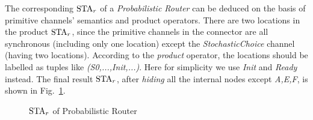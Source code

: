 \begin{example}
The corresponding $\mbox{STA}_r$ of a \emph{Probabilistic Router} can be deduced on the basis of primitive channels' semantics and product operators.
There are two locations in the product $\mbox{STA}_r$, since the primitive channels in the connector are all synchronous (including only one location) except the \emph{StochasticChoice} channel (having two locations). According to the \emph{product} operator, the locations should be labelled as tuples like \emph{(S0,...,Init,...)}. Here for simplicity we use \emph{Init} and \emph{Ready} instead.
The final result $\mbox{STA}_r$, after \emph{hiding} all the internal nodes except \emph{A,E,F}, is shown in Fig.~\ref{fig:probabilistic_router}. 
\begin{figure}[H]
\centering

\caption{$\mbox{STA}_r$ of Probabilistic Router}
\label{fig:probabilistic_router}
\end{figure}
\end{example}


%         


